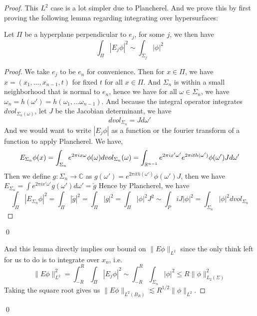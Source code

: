 \begin{proof}
This $L^2$ case is a lot simpler due to Plancherel. And we prove this by first proving the following lemma regarding integrating over hypersurfaces:
\begin{lemma}
    Let $\Pi$ be a hyperplane perpendicular to $e_j$, for some $j$, we then have
    \begin{equation*}
        \int_\Pi|E_j\phi|^2\sim\int_{\Sigma_j}|\phi|^2
    \end{equation*}
\end{lemma}
\begin{proof}
    We take $e_j$ to be $e_n$ for convenience. Then for $x\in\Pi$, we have $x=(x_1, ...,x_{n-1}, t)$ for fixed $t$ for all $x\in\Pi$. And $\Sigma_n$ is within a small neighborhood that is normal to $e_n$, hence we have for all $\omega\in\Sigma_n$, we have $\omega_n=h(\omega')=h(\omega_1,...\omega_{n-1})$. And because the integral operator integrates $dvol_{\Sigma_n(\omega)}$, let $J$ be the Jacobian determinant, we have
    \begin{equation*}
        dvol_{\Sigma_n}=Jd\omega'
    \end{equation*}
    And we would want to write $|E_j\phi|$ as a function or the fourier transform of a function to apply Plancherel. We have,
    \begin{equation*}
        E_{\Sigma_n}\phi(x)=\int_{\Sigma_n}e^{2\pi ix\omega}\phi(\omega)dvol_{\Sigma_n}(\omega)=\int_{\mathbb{R}^{n-1}}e^{2\pi ix'\omega'}e^{2\pi ith(\omega')}\phi(\omega')Jd\omega'
    \end{equation*}
    Then we define $g:\Sigma_n\to\mathbb{C}$ as $g(\omega')=e^{2\pi ith(\omega')}\phi(\omega')J$, then we have $E_{\Sigma_n}=\int e^{2\pi ix'\omega'}g(\omega')d\omega'=\check{g}$
    Hence by Plancherel, we have 
    \begin{equation*}
        \int_\Pi|E_{\Sigma_n}\phi|^2=\int_\Pi|\check{g}|^2=\int_\Pi|g|^2=\int_\Pi|\phi|^2J^2\sim\int_PiJ|\phi|^2=\int_{\Sigma_n}|\phi|^2dvol_{\Sigma_n}
    \end{equation*}
\end{proof}
\qed

And this lemma directly implies our bound on $\|E\phi\|_{L^2}$ since the only think left for us to do is to integrate over $x_n$, i.e. 
\begin{equation*}
    \|E\phi\|_{L^2}^2=\int_{-R}^R\int_\Pi|E_j\phi|^2\sim\int_{-R}^R\int_{\Sigma_n}|\phi|^2\leq R\|\phi\|_{L_2(\Sigma)}^2
\end{equation*}
Taking the square root gives us $\|E\phi\|_{L^2(B_R)}\lesssim R^{1/2}\|\phi\|_{L^2}$.
\end{proof}
\qed

